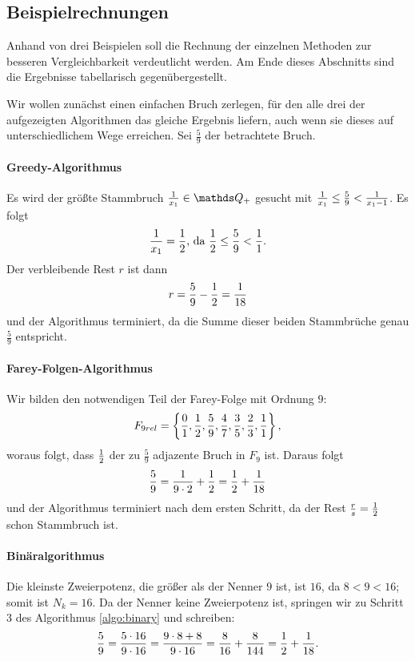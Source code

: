 \subsection{Beispielrechnungen}

Anhand von drei Beispielen soll die Rechnung der einzelnen Methoden zur besseren Vergleichbarkeit verdeutlicht werden. Am Ende dieses Abschnitts sind die Ergebnisse tabellarisch gegenübergestellt.

\begin{bsp}
	Wir wollen zunächst einen einfachen Bruch zerlegen, für den alle drei der aufgezeigten Algorithmen das gleiche Ergebnis liefern, auch wenn sie dieses auf unterschiedlichem Wege erreichen.
	Sei $\frac{5}{9}$ der betrachtete Bruch.
	\paragraph{Greedy-Algorithmus} Es wird der größte Stammbruch $\uf{x_1} \in \Q_+$ gesucht mit $\frac{1}{x_1} \leq \frac{5}{9} < \frac{1}{x_1-1}$. Es folgt $$\frac{1}{x_1} = \frac{1}{2} \text{, da }
	\frac{1}{2} \leq \frac{5}{9} < \frac{1}{1}.$$
	Der verbleibende Rest $r$ ist dann $$r = \frac{5}{9} - \frac{1}{2} = \frac{1}{18}$$
	und der Algorithmus terminiert, da die Summe dieser beiden Stammbrüche genau $\frac{5}{9}$ entspricht.
	
	\paragraph{Farey-Folgen-Algorithmus}Wir bilden den notwendigen Teil der Farey-Folge mit Ordnung $9$: $$F_{9rel} = \left\{ \frac{0}{1}, \frac{1}{2}, \frac{5}{9}, \frac{4}{7}, \frac{3}{5}, \frac{2}{3}, \frac{1}{1}\right\},$$ woraus folgt, dass $\frac{1}{2}$ der zu $\frac{5}{9}$ adjazente Bruch in $F_9$ ist. Daraus folgt 
	$$\frac{5}{9} = \frac{1}{9 \cdot 2} + \frac{1}{2} = \frac{1}{2} + \frac{1}{18}$$ und der Algorithmus terminiert nach dem ersten Schritt, da der Rest $\frac{r}{s} = \frac{1}{2}$ schon Stammbruch ist.
	
	\paragraph{Binäralgorithmus}Die kleinste Zweierpotenz, die größer als der Nenner $9$ ist, ist $16$, da $8<9<16$; somit ist $N_k = 16$. Da der Nenner keine Zweierpotenz ist, springen wir zu Schritt 3 des Algorithmus \ref{algo:binary} und schreiben:
	$$\frac{5}{9} = \frac{5\cdot16}{9 \cdot 16} = \frac{9 \cdot 8 + 8}{9 \cdot 16} = \frac{8}{16} + \frac{8}{144} = \frac{1}{2} + \frac{1}{18}.$$
	

\end{bsp}

